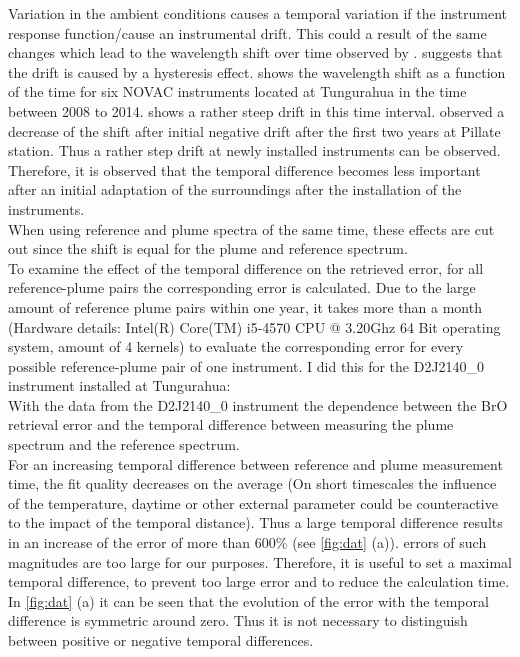 Variation in the ambient conditions causes a temporal variation if the instrument response function/cause an instrumental drift. This could a result of the same changes which lead to the wavelength shift over time observed by \citet{WarnachSimon}.  \citet{WarnachSimon} suggests that the drift is caused by a hysteresis effect.  shows the wavelength shift as a function of the time for six NOVAC instruments located at Tungurahua in the time between 2008 to 2014.  shows a rather steep drift in this time interval.
\citet{WarnachSimon} observed a decrease of the shift after initial negative drift after the first two years at Pillate station. Thus a rather step drift at newly installed instruments can be observed. Therefore, it is observed that the temporal difference becomes less important after an initial adaptation of the surroundings after the installation of the instruments.\\
When using reference and plume spectra of the same time, these effects are cut out since the shift is equal for the plume and reference spectrum.\\
To examine the effect of the temporal difference on the retrieved  error, for all reference-plume pairs the corresponding  error is calculated. Due to the large amount of reference plume pairs within one year, it takes more than a month (Hardware details: Intel(R) Core(TM) i5-4570 CPU @ 3.20Ghz 64 Bit operating system, amount of 4 kernels) to evaluate the corresponding  error for every possible reference-plume pair of one instrument. I did this for the  D2J2140\_0 instrument installed at Tungurahua:\\
With the data from the D2J2140\_0 instrument the dependence between the BrO retrieval error and the temporal difference between measuring the plume spectrum and the reference spectrum.\\
For an increasing temporal difference between reference and plume measurement time, the fit quality decreases on the average (On short timescales the influence of the temperature, daytime or other external parameter could be counteractive to the impact of the temporal distance). Thus a large temporal difference results in an increase of the   error of more than 600\% (see \cref{fig:dat} (a)).
 errors of such magnitudes are too large for our purposes. Therefore, it is useful to set a maximal temporal difference, to prevent too large  error and to reduce the calculation time.
%
In \cref{fig:dat} (a) it can be seen that the evolution of the   error with the temporal difference is symmetric around zero. Thus it is not necessary to distinguish between positive or negative temporal differences.
